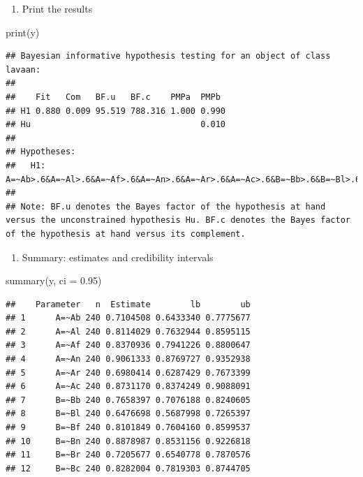 \documentclass[
]{book}
\newenvironment{Shaded}{\begin{snugshade}}{\end{snugshade}}
\newcommand{\AttributeTok}[1]{\textcolor[rgb]{0.77,0.63,0.00}{#1}}
\newcommand{\FloatTok}[1]{\textcolor[rgb]{0.00,0.00,0.81}{#1}}
\newcommand{\FunctionTok}[1]{\textcolor[rgb]{0.00,0.00,0.00}{#1}}
\newcommand{\NormalTok}[1]{#1}
\providecommand{\tightlist}{%
  \setlength{\itemsep}{0pt}\setlength{\parskip}{0pt}}
\begin{document}
\begin{enumerate}
\def\labelenumi{\arabic{enumi})}
\setcounter{enumi}{3}
\tightlist
\item
  Print the results
\end{enumerate}

\begin{Shaded}
\begin{Highlighting}[]
\FunctionTok{print}\NormalTok{(y)}
\end{Highlighting}
\end{Shaded}

\begin{verbatim}
## Bayesian informative hypothesis testing for an object of class lavaan:
## 
##    Fit   Com   BF.u   BF.c    PMPa  PMPb 
## H1 0.880 0.009 95.519 788.316 1.000 0.990
## Hu                                  0.010
## 
## Hypotheses:
##   H1: A=~Ab>.6&A=~Al>.6&A=~Af>.6&A=~An>.6&A=~Ar>.6&A=~Ac>.6&B=~Bb>.6&B=~Bl>.6&B=~Bf>.6&B=~Bn>.6&B=~Br>.6&B=~Bc>.6
## 
## Note: BF.u denotes the Bayes factor of the hypothesis at hand versus the unconstrained hypothesis Hu. BF.c denotes the Bayes factor of the hypothesis at hand versus its complement.
\end{verbatim}

\begin{enumerate}
\def\labelenumi{\arabic{enumi})}
\setcounter{enumi}{4}
\tightlist
\item
  Summary: estimates and credibility intervals
\end{enumerate}

\begin{Shaded}
\begin{Highlighting}[]
\FunctionTok{summary}\NormalTok{(y, }\AttributeTok{ci =} \FloatTok{0.95}\NormalTok{)}
\end{Highlighting}
\end{Shaded}

\begin{verbatim}
##    Parameter   n  Estimate        lb        ub
## 1      A=~Ab 240 0.7104508 0.6433340 0.7775677
## 2      A=~Al 240 0.8114029 0.7632944 0.8595115
## 3      A=~Af 240 0.8370936 0.7941226 0.8800647
## 4      A=~An 240 0.9061333 0.8769727 0.9352938
## 5      A=~Ar 240 0.6980414 0.6287429 0.7673399
## 6      A=~Ac 240 0.8731170 0.8374249 0.9088091
## 7      B=~Bb 240 0.7658397 0.7076188 0.8240605
## 8      B=~Bl 240 0.6476698 0.5687998 0.7265397
## 9      B=~Bf 240 0.8101849 0.7604160 0.8599537
## 10     B=~Bn 240 0.8878987 0.8531156 0.9226818
## 11     B=~Br 240 0.7205677 0.6540778 0.7870576
## 12     B=~Bc 240 0.8282004 0.7819303 0.8744705
\end{verbatim}
\end{document}
